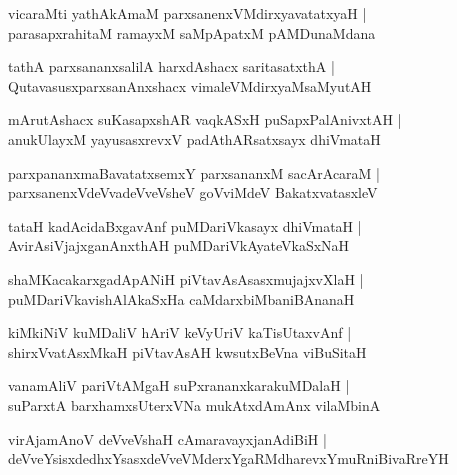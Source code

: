\documentclass[twoside,12pt,openright]{book}
\newcounter{shloka}[chapter]
\begin{document}
\begin{shloka}%
vicaraMti yathAkAmaM parxsanenxVMdirxyavatatxyaH |\\
parasapxrahitaM ramayxM saMpApatxM pAMDunaMdana 
\end{shloka}

\begin{shloka}%
tathA parxsananxsalilA harxdAshacx saritasatxthA |\\
QutavasusxparxsanAnxshacx vimaleVMdirxyaMsaMyutAH 
\end{shloka}

\begin{shloka}%
mArutAshacx suKasapxshAR vaqkASxH puSapxPalAnivxtAH |\\
anukUlayxM yayusasxrevxV padAthARsatxsayx dhiVmataH 
\end{shloka}

\begin{shloka}%
parxpananxmaBavatatxsemxY parxsananxM sacArAcaraM |\\
parxsanenxVdeVvadeVveVsheV goVviMdeV BakatxvatasxleV 
\end{shloka}

\begin{shloka}%
tataH kadAcidaBxgavAnf puMDariVkasayx dhiVmataH |\\
AvirAsiVjajxganAnxthAH puMDariVkAyateVkaSxNaH
\end{shloka}

\begin{shloka}%
shaMKacakarxgadApANiH piVtavAsAsasxmujajxvXlaH |\\
puMDariVkavishAlAkaSxHa caMdarxbiMbaniBAnanaH 
\end{shloka}

\begin{shloka}%
kiMkiNiV kuMDaliV hAriV keVyUriV kaTisUtaxvAnf |\\
shirxVvatAsxMkaH piVtavAsAH kwsutxBeVna viBuSitaH 
\end{shloka}

\begin{shloka}%
vanamAliV pariVtAMgaH suPxrananxkarakuMDalaH |\\
suParxtA barxhamxsUterxVNa mukAtxdAmAnx vilaMbinA 
\end{shloka}

\begin{shloka}%
virAjamAnoV deVveVshaH cAmaravayxjanAdiBiH |\\
deVveYsisxdedhxYsasxdeVveVMderxYgaRMdharevxYmuRniBivaRreYH
\end{shloka}
\end{document}
